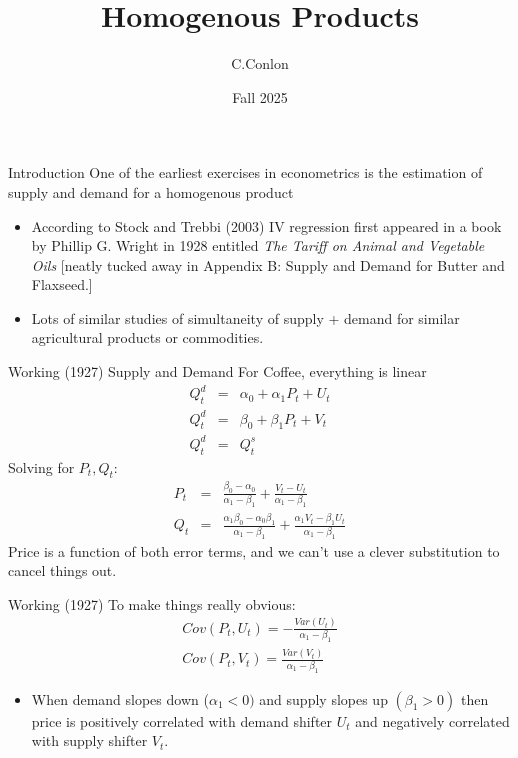 




\title [Homogenous Products]{Homogenous Products}
\author{C.Conlon}
\date{Fall 2025}


\begin{frame}
\titlepage
\end{frame}

\begin{frame}{Introduction}
One of the earliest exercises in econometrics is the estimation of supply and demand for a homogenous product
\begin{itemize}
\item According to Stock and Trebbi (2003) IV regression first appeared in a book by Phillip G. Wright in 1928 entitled \textit{The Tariff on Animal and Vegetable Oils} [neatly tucked away in Appendix B:  Supply and Demand for Butter and Flaxseed.]
\item Lots of similar studies of simultaneity of supply + demand for similar agricultural products or commodities.
\end{itemize}
\end{frame}

\begin{frame}{Working (1927)}
Supply and Demand For Coffee, everything is linear
\begin{eqnarray*}
Q_t^d &=& \alpha_0 + \alpha_1 P_t + U_t\\
Q_t^d &=& \beta_0 + \beta_1 P_t + V_t\\
Q_t^d &=& Q_t^s
\end{eqnarray*}
Solving for $P_t,Q_t$:
\begin{eqnarray*}
P_t &=& \frac{\beta_0 - \alpha_0}{\alpha_1 - \beta_1} + \frac{V_t - U_t}{\alpha_1 - \beta_1}\\
Q_t &=& \frac{\alpha_1 \beta_0 - \alpha_0 \beta_1}{\alpha_1 - \beta_1} + \frac{\alpha_1 V_t - \beta_1 U_t}{\alpha_1 - \beta_1}
\end{eqnarray*}
Price is a function of both error terms, and we can't use a clever substitution to cancel things out.
\end{frame}

\begin{frame}{Working (1927)}
To make things really obvious:
\begin{eqnarray*}
Cov(P_t,U_t) = - \frac{Var(U_t)}{\alpha_1 -\beta_1} \\
Cov(P_t,V_t) =  \frac{Var(V_t)}{\alpha_1 -\beta_1} 
\end{eqnarray*}
\begin{itemize}
\item When demand slopes down ($\alpha_1 < 0)$ and supply slopes up $(\beta_1 > 0)$ then price is positively correlated with demand shifter $U_t$ and negatively correlated with supply shifter $V_t$.
\end{itemize}
\end{frame}

